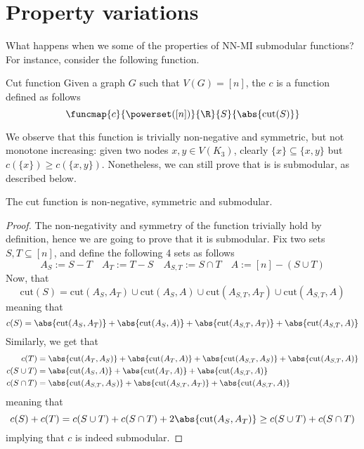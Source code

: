 \documentclass[a4paper, 12pt]{report}
\begin{document}
    \section{Property variations}

    What happens when we  some of the properties of NN-MI submodular functions? For instance, consider the following function.

    \begin{frameddefn}{Cut function}
        Given a graph $G$ such that $V(G) = [n]$, the  $c$ is a function defined as follows $$\funcmap{c}{\powerset([n])}{\R}{S}{\abs{\mathrm{cut}(S)}}$$
    \end{frameddefn}

    We observe that this function is trivially non-negative and symmetric, but not monotone increasing: given two nodes $x, y \in V(K_3)$, clearly $\{x\} \subseteq \{x, y\}$ but $c(\{x\}) \ge c(\{x, y\})$. Nonetheless, we can still prove that is is submodular, as described below.

    \begin{framedprop}{}
        The cut function is non-negative, symmetric and submodular.
    \end{framedprop}

    \begin{proof}
        The non-negativity and symmetry of the function trivially hold by definition, hence we are going to prove that it is submodular. Fix two sets $S, T \subseteq [n]$, and define the following 4 sets as follows $$A_S := S - T \quad A_T := T - S \quad A_{S, T} := S \cap T \quad A := [n] - (S \cup T)$$ Now, that $$\mathrm{cut}(S) = \mathrm{cut}(A_S, A_T) \cup \mathrm{cut}(A_S, A) \cup \mathrm{cut}(A_{S, T}, A_T) \cup \mathrm{cut}(A_{S, T}, A)$$ meaning that $$c(S) = \abs{\mathrm{cut}(A_S, A_T)} + \abs{\mathrm{cut}(A_S, A)} + \abs{\mathrm{cut}(A_{S, T}, A_T)} + \abs{\mathrm{cut}(A_{S, T}, A)}$$ Similarly, we get that
        \begin{equation*}
            \begin{split}
                c(T) &= \abs{\mathrm{cut}(A_T, A_S)} + \abs{\mathrm{cut}(A_T, A)} + \abs{\mathrm{cut}(A_{S, T}, A_S)} + \abs{\mathrm{cut}(A_{S, T}, A)} \\
                c(S \cup T) &= \abs{\mathrm{cut}(A_S, A)} + \abs{\mathrm{cut}(A_T, A)} + \abs{\mathrm{cut}(A_{S, T}, A)} \\
                c(S \cap T) &= \abs{\mathrm{cut}(A_{S, T}, A_S)} + \abs{\mathrm{cut}(A_{S, T}, A_T)} + \abs{\mathrm{cut}(A_{S, T}, A)}
            \end{split}
        \end{equation*}
        meaning that $$c(S) + c(T) = c(S \cup T) + c(S \cap T) + 2 \abs{\mathrm{cut}(A_S, A_T)} \ge c(S \cup T) + c(S \cap T)$$ implying that $c$ is indeed submodular.
    \end{proof}
\end{document}
